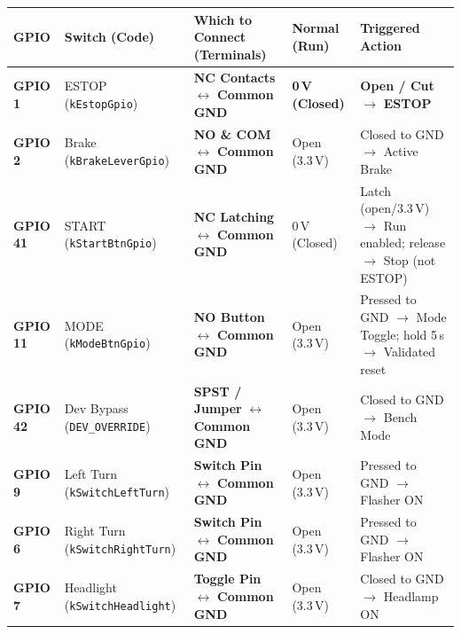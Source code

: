 \documentclass[11pt,a4paper]{article}
\begin{document}
\begin{tcolorbox}[bwcard, title={1. Digital Inputs \& Pilot Switches (Pin-to-Pin Terminal Connections)}]
\begin{tabularx}{\textwidth}{@{} C{1.9cm} L{3.8cm} L{4.6cm} C{2.2cm} Y @{}}
\toprule
\textbf{GPIO} & \textbf{Switch (Code)} & \textbf{Which to Connect (Terminals)} & \textbf{Normal (Run)} & \textbf{Triggered Action} \\
\midrule
\textbf{GPIO 1} & ESTOP (\texttt{kEstopGpio}) & \textbf{NC Contacts} $\longleftrightarrow$ \textbf{Common GND} & \textbf{0\,V (Closed)} & \textbf{Open / Cut} $\rightarrow$ \textbf{ESTOP} \\
\textbf{GPIO 2} & Brake (\texttt{kBrakeLeverGpio}) & \textbf{NO \& COM} $\longleftrightarrow$ \textbf{Common GND} & Open (3.3\,V) & Closed to GND $\rightarrow$ Active Brake \\
\textbf{GPIO 41} & START (\texttt{kStartBtnGpio}) & \textbf{NC Latching} $\longleftrightarrow$ \textbf{Common GND} & 0\,V (Closed) & Latch (open/3.3\,V) $\rightarrow$ Run enabled; release $\rightarrow$ Stop (not ESTOP) \\
\textbf{GPIO 11} & MODE (\texttt{kModeBtnGpio}) & \textbf{NO Button} $\longleftrightarrow$ \textbf{Common GND} & Open (3.3\,V) & Pressed to GND $\rightarrow$ Mode Toggle; hold 5\,s $\rightarrow$ Validated reset \\
\textbf{GPIO 42} & Dev Bypass (\texttt{DEV\_OVERRIDE}) & \textbf{SPST / Jumper} $\longleftrightarrow$ \textbf{Common GND} & Open (3.3\,V) & Closed to GND $\rightarrow$ Bench Mode \\
\textbf{GPIO 9} & Left Turn (\texttt{kSwitchLeftTurn}) & \textbf{Switch Pin} $\longleftrightarrow$ \textbf{Common GND} & Open (3.3\,V) & Pressed to GND $\rightarrow$ Flasher ON \\
\textbf{GPIO 6} & Right Turn (\texttt{kSwitchRightTurn}) & \textbf{Switch Pin} $\longleftrightarrow$ \textbf{Common GND} & Open (3.3\,V) & Pressed to GND $\rightarrow$ Flasher ON \\
\textbf{GPIO 7} & Headlight (\texttt{kSwitchHeadlight}) & \textbf{Toggle Pin} $\longleftrightarrow$ \textbf{Common GND} & Open (3.3\,V) & Closed to GND $\rightarrow$ Headlamp ON \\
\bottomrule
\end{tabularx}
\end{tcolorbox}

\vspace{-5pt}
\end{document}
